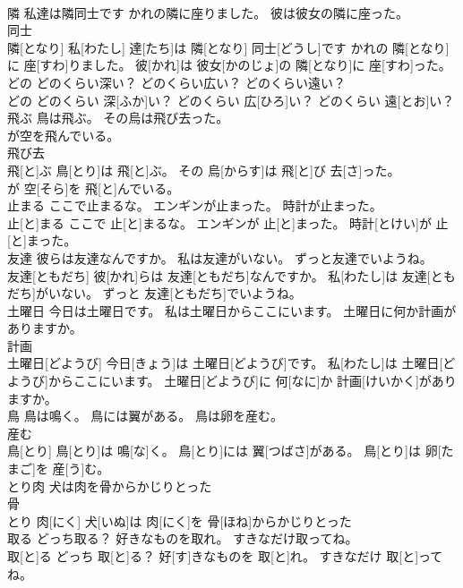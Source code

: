 \documentclass[8pt]{extreport}
\begin{document}
\begin{CJK}{UTF8}{min}
\\	隣 私達は隣同士です かれの隣に座りました。 彼は彼女の隣に座った。	
\\	同士 
\\	隣[となり] 私[わたし] 達[たち]は 隣[となり] 同士[どうし]です かれの 隣[となり]に 座[すわ]りました。 彼[かれ]は 彼女[かのじょ]の 隣[となり]に 座[すわ]った。
\\	どの どのくらい深い？ どのくらい広い？ どのくらい遠い？	
\\	どの どのくらい 深[ふか]い？ どのくらい 広[ひろ]い？ どのくらい 遠[とお]い？
\\	飛ぶ 鳥は飛ぶ。 その烏は飛び去った。 
\\	が空を飛んでいる。	
\\	飛び去 
\\	飛[と]ぶ 鳥[とり]は 飛[と]ぶ。 その 烏[からす]は 飛[と]び 去[さ]った。 
\\	が 空[そら]を 飛[と]んでいる。
\\	止まる ここで止まるな。 エンギンが止まった。 時計が止まった。	
\\	止[と]まる ここで 止[と]まるな。 エンギンが 止[と]まった。 時計[とけい]が 止[と]まった。
\\	友達 彼らは友達なんですか。 私は友達がいない。 ずっと友達でいようね。	
\\	友達[ともだち] 彼[かれ]らは 友達[ともだち]なんですか。 私[わたし]は 友達[ともだち]がいない。 ずっと 友達[ともだち]でいようね。
\\	土曜日 今日は土曜日です。 私は土曜日からここにいます。 土曜日に何か計画がありますか。	
\\	計画 
\\	土曜日[どようび] 今日[きょう]は 土曜日[どようび]です。 私[わたし]は 土曜日[どようび]からここにいます。 土曜日[どようび]に 何[なに]か 計画[けいかく]がありますか。
\\	鳥 鳥は鳴く。 鳥には翼がある。 鳥は卵を産む。	
\\	産む 
\\	鳥[とり] 鳥[とり]は 鳴[な]く。 鳥[とり]には 翼[つばさ]がある。 鳥[とり]は 卵[たまご]を 産[う]む。
\\	とり肉 犬は肉を骨からかじりとった	
\\	骨 
\\	とり 肉[にく] 犬[いぬ]は 肉[にく]を 骨[ほね]からかじりとった
\\	取る どっち取る？ 好きなものを取れ。 すきなだけ取ってね。	
\\	取[と]る どっち 取[と]る？ 好[す]きなものを 取[と]れ。 すきなだけ 取[と]ってね。

\end{CJK}
\end{document}

